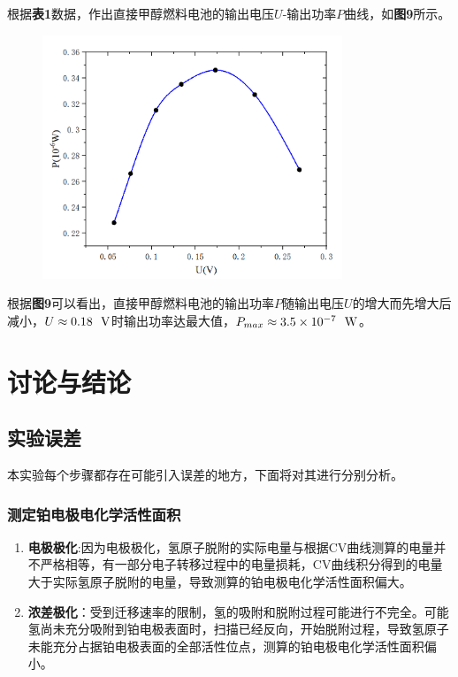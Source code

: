 \documentclass[12pt]{article}
\begin{document}
			\par
			根据\textbf{表1}数据，作出直接甲醇燃料电池的输出电压$U$-输出功率$P$曲线，如\textbf{图9}所示。
			\begin{figure}[h]
				\centering
				\includegraphics[width=0.8\textwidth]{9.png}
			\end{figure}
			\par
			根据\textbf{图9}可以看出，直接甲醇燃料电池的输出功率$P$随输出电压$U$的增大而先增大后减小，$U\approx0.18\ \ {\rm V}$时输出功率达最大值，$P_{max}\approx 3.5\times10^{-7}\ \ {\rm W}$。

	\section{讨论与结论}
	 \subsection{实验误差}
	 本实验每个步骤都存在可能引入误差的地方，下面将对其进行分别分析。\par
		\subsubsection{测定铂电极电化学活性面积}
		\begin{enumerate}
			\item \textbf{电极极化}:因为电极极化，氢原子脱附的实际电量与根据CV曲线测算的电量并不严格相等，有一部分电子转移过程中的电量损耗，CV曲线积分得到的电量大于实际氢原子脱附的电量，导致测算的铂电极电化学活性面积偏大。
			\item \textbf{浓差极化}：受到迁移速率的限制，氢的吸附和脱附过程可能进行不完全。可能氢尚未充分吸附到铂电极表面时，扫描已经反向，开始脱附过程，导致氢原子未能充分占据铂电极表面的全部活性位点，测算的铂电极电化学活性面积偏小。
		\end{enumerate}
\end{document}
